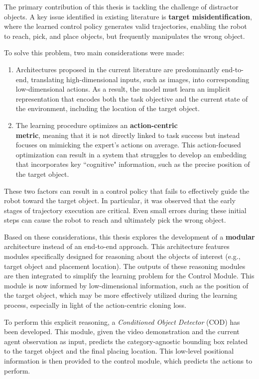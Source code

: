 The primary contribution of this thesis is tackling the challenge of distractor objects. A key issue identified in existing literature is \textbf{target misidentification}, where the learned control policy generates valid trajectories, enabling the robot to reach, pick, and place objects, but frequently manipulates the wrong object.

To solve this problem, two main considerations were made:

\begin{enumerate}[label=\textbf{(\arabic*)}]
    \item Architectures proposed in the current literature are predominantly end-to-end, translating high-dimensional inputs, such as images, into corresponding low-dimensional actions. As a result, the model must learn an implicit representation that encodes both the task objective and the current state of the environment, including the location of the target object.
    \item The learning procedure optimizes an \textbf{action-centric \\ metric}, meaning that it is not directly linked to task success but instead focuses on mimicking the expert's actions on average. This action-focused optimization can result in a system that struggles to develop an embedding that incorporates key ``cognitive" information, such as the precise position of the target object.    
\end{enumerate}

These two factors can result in a control policy that fails to effectively guide the robot toward the target object. In particular, it was observed that the early stages of trajectory execution are critical. Even small errors during these initial steps can cause the robot to reach and ultimately pick the wrong object.

Based on these considerations, this thesis explores the development of a \textbf{modular} architecture instead of an end-to-end approach. This architecture features modules specifically designed for reasoning about the objects of interest (e.g., target object and placement location). The outputs of these reasoning modules are then integrated to simplify the learning problem for the Control Module. This module is now informed by low-dimensional information, such as the position of the target object, which may be more effectively utilized during the learning process, especially in light of the action-centric cloning loss.

To perform this explicit reasoning, a \textit{Conditioned Object Detector} (COD) has been developed. This module, given the video demonstration and the current agent observation as input, predicts the category-agnostic bounding box related to the target object and the final placing location. This low-level positional information is then provided to the control module, which predicts the actions to perform.

